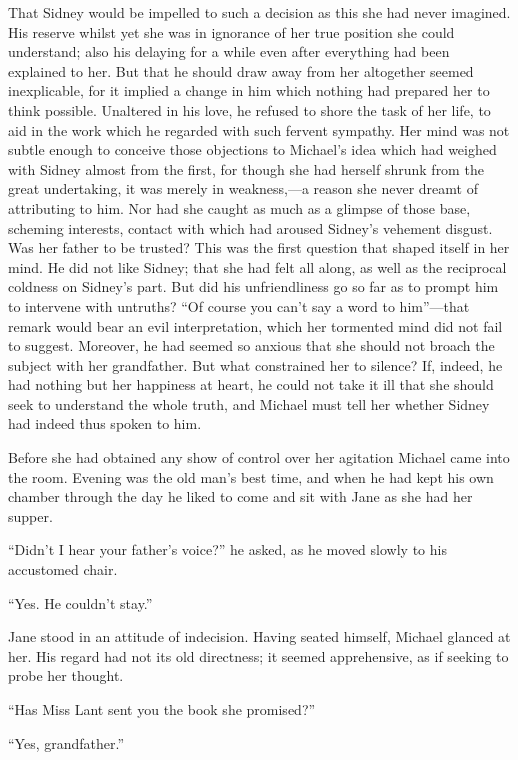 That Sidney would be impelled to such a decision as this she had never
imagined. His reserve whilst yet she was in ignorance of her true
position she could understand; also his delaying for a while even after
everything had been explained to her. But that he should draw away from
her altogether seemed inexplicable, for it implied a change in him which
nothing had prepared her to think possible. Unaltered in his love, he
refused to shore the task of her life, to aid in the work which he
regarded with such fervent sympathy. Her mind was not subtle enough to
conceive those objections to Michael's idea
{\protect\hypertarget{128}{}{}}which had weighed with Sidney almost from
the first, for though she had herself shrunk from the great undertaking,
it was merely in weakness,---a reason she never dreamt of attributing to
him. Nor had she caught as much as a glimpse of those base, scheming
interests, contact with which had aroused Sidney's vehement disgust. Was
her father to be trusted? This was the first question that shaped itself
in her mind. He did not like Sidney; that she had felt all along, as
well as the reciprocal coldness on Sidney's part. But did his
unfriendliness go so far as to prompt him to intervene with untruths?
``Of course you can't say a word to him''---that remark would bear an
evil interpretation, which her tormented mind did not fail to suggest.
Moreover, he had seemed so anxious that she should not broach the
subject with her grandfather. But what constrained her to silence? If,
indeed, he had nothing but her happiness at heart, he could not take it
ill that she should seek to understand the whole truth, and Michael must
tell her whether Sidney had indeed thus spoken to him.

Before she had obtained any show of control over her agitation Michael
came into the room. {\protect\hypertarget{129}{}{}}Evening was the old
man's best time, and when he had kept his own chamber through the day he
liked to come and sit with Jane as she had her supper.

``Didn't I hear your father's voice?'' he asked, as he moved slowly to
his accustomed chair.

``Yes. He couldn't stay.''

Jane stood in an attitude of indecision. Having seated himself, Michael
glanced at her. His regard had not its old directness; it seemed
apprehensive, as if seeking to probe her thought.

``Has Miss Lant sent you the book she promised?''

``Yes, grandfather.''

